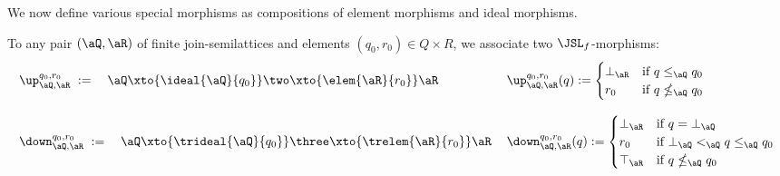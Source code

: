 \documentclass{article}
\begin{document}
We now define various special morphisms as compositions of element morphisms and ideal morphisms.

\begin{definition}
\label{def:spec_hom_morphisms}
\item
To any pair $(\aQ,\aR)$ of finite join-semilattices and elements $(q_0,r_0) \in Q \times R$, we associate two $\JSL_f$-morphisms:
\[
\begin{tabular}{lll}
$\up_{\aQ,\aR}^{q_0,r_0} \; := \quad
\aQ \xto{\ideal{\aQ}{q_0}} \two \xto{\elem{\aR}{r_0}} \aR$
&
$\up_{\aQ,\aR}^{q_0,r_0}(q) := \begin{cases}
\bot_\aR & \text{if $q \leq_\aQ q_0$}
\\
r_0 & \text{if $q \nleq_\aQ q_0$}
\end{cases}$
\\ \\
$\down_{\aQ,\aR}^{q_0,r_0} \; := \quad
\aQ \xto{\trideal{\aQ}{q_0}} \three \xto{\trelem{\aR}{r_0}} \aR$
&
$\down_{\aQ,\aR}^{q_0,r_0}(q) := \begin{cases}
\bot_\aR & \text{if $q = \bot_\aQ$}
\\
r_0 & \text{if $\bot_\aQ <_\aQ q \leq_\aQ q_0$}
\\
\top_\aR & \text{if $q \nleq_\aQ q_0$}
\end{cases}$
\end{tabular}
\]
\endbox
\end{definition}
\end{document}
